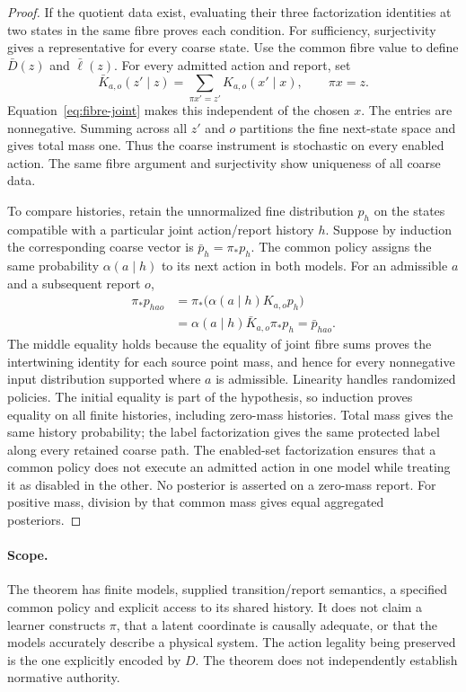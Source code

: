 \begin{proof}
If the quotient data exist, evaluating their three factorization identities at two states in the same fibre proves each condition. For sufficiency, surjectivity gives a representative for every coarse state. Use the common fibre value to define $\bar D(z)$ and $\bar\ell(z)$. For every admitted action and report, set
\[
\bar K_{a,o}(z'\mid z)=\sum_{\pi x'=z'}K_{a,o}(x'\mid x),\qquad \pi x=z.
\]
Equation~\eqref{eq:fibre-joint} makes this independent of the chosen $x$. The entries are nonnegative. Summing across all $z'$ and $o$ partitions the fine next-state space and gives total mass one. Thus the coarse instrument is stochastic on every enabled action. The same fibre argument and surjectivity show uniqueness of all coarse data.

To compare histories, retain the unnormalized fine distribution $p_h$ on the states compatible with a particular joint action/report history $h$. Suppose by induction the corresponding coarse vector is $\bar p_h=\pi_*p_h$. The common policy assigns the same probability $\alpha(a\mid h)$ to its next action in both models. For an admissible $a$ and a subsequent report $o$,
\[
\begin{aligned}
\pi_*p_{hao}
&=\pi_*\bigl(\alpha(a\mid h)K_{a,o}p_h\bigr)\\
&=\alpha(a\mid h)\bar K_{a,o}\pi_*p_h
=\bar p_{hao}.
\end{aligned}
\]
The middle equality holds because the equality of joint fibre sums proves the intertwining identity for each source point mass, and hence for every nonnegative input distribution supported where $a$ is admissible. Linearity handles randomized policies. The initial equality is part of the hypothesis, so induction proves equality on all finite histories, including zero-mass histories. Total mass gives the same history probability; the label factorization gives the same protected label along every retained coarse path. The enabled-set factorization ensures that a common policy does not execute an admitted action in one model while treating it as disabled in the other. No posterior is asserted on a zero-mass report. For positive mass, division by that common mass gives equal aggregated posteriors.
\end{proof}

\paragraph{Scope.} The theorem has finite models, supplied transition/report semantics, a specified common policy and explicit access to its shared history. It does not claim a learner constructs $\pi$, that a latent coordinate is causally adequate, or that the models accurately describe a physical system. The action legality being preserved is the one explicitly encoded by $D$. The theorem does not independently establish normative authority.

